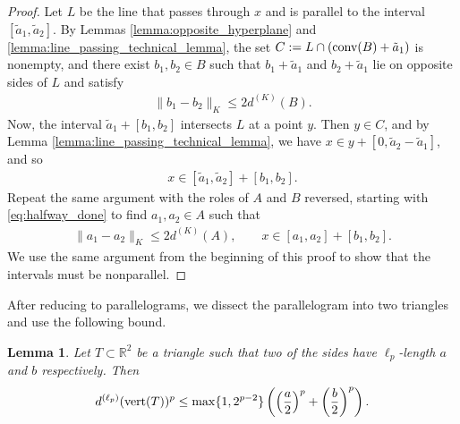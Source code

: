 \documentclass[11pt]{article}
\newtheorem{lemma}{Lemma}[section]
\begin{document}
\begin{proof}
    Let $L$ be the line that passes through $x$ and is parallel to the interval $[\tilde{a}_1,\tilde{a}_2]$. By Lemmas \ref{lemma:opposite_hyperplane} and \ref{lemma:line_passing_technical_lemma}, the set $C:=L\cap (\textup{conv}(B)+\tilde{a}_1)$ is nonempty, and there exist $b_1,b_2\in B$ such that $b_1+\tilde{a}_1$ and $b_2+\tilde{a}_1$ lie on opposite sides of $L$ and satisfy
    \begin{align*}
        \|b_1-b_2\|_K\leq 2d^{(K)}(B).
    \end{align*}
    Now, the interval $\tilde{a}_1+[b_1,b_2]$ intersects $L$ at a point $y$. Then $y\in C$, and by Lemma \ref{lemma:line_passing_technical_lemma}, we have $x\in y+[0,\tilde{a}_2-\tilde{a}_1]$, and so
    \begin{align}\label{eq:halfway_done}
        x\in [\tilde{a}_1,\tilde{a}_2]+[b_1,b_2].
    \end{align}
    Repeat the same argument with the roles of $A$ and $B$ reversed, starting with \eqref{eq:halfway_done} to find $a_1,a_2\in A$ such that
    \begin{align*}
        \|a_1-a_2\|_K\leq 2d^{(K)}(A),\qquad x\in [a_1,a_2]+[b_1,b_2].
    \end{align*}
    We use the same argument from the beginning of this proof to show that the intervals must be nonparallel.
\end{proof}

After reducing to parallelograms, we dissect the parallelogram into two triangles and use the following bound.

\begin{lemma}\label{lemma:triangle_lemma}
    Let $T\subset\mathbb{R}^2$ be a triangle such that two of the sides have $\ell_p$-length $a$ and $b$ respectively. Then
    \begin{align*}
        d^{(\ell_p)}(\textup{vert}(T))^p\leq \max\{1,2^{p-2}\}\left(\left(\frac{a}{2}\right)^p+\left(\frac{b}{2}\right)^p\right).
    \end{align*}
\end{lemma}
\end{document}

